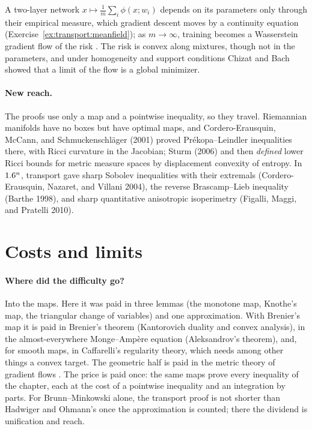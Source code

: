 \begin{refsection}
A two-layer network $x\mapsto\frac1m\sum_i\phi(x;w_i)$ depends on its parameters only through their empirical measure, which gradient descent moves by a continuity equation (Exercise~\ref{ex:transport:meanfield}); as $m\to\infty$, training becomes a Wasserstein gradient flow of the risk \parencite{ChizatBach2018,MeiMontanariNguyen2018}. The risk is convex along mixtures, though not in the parameters, and under homogeneity and support conditions Chizat and Bach showed that a limit of the flow is a global minimizer.

\paragraph{New reach.}\label{sec:transport:reach} The proofs use only a map and a pointwise inequality, so they travel. Riemannian manifolds have no boxes but have optimal maps, and Cordero-Erausquin, McCann, and Schmuckenschl\"ager (2001) proved Pr\'ekopa--Leindler inequalities there, with Ricci curvature in the Jacobian; Sturm (2006) and \textcite{LottVillani2009} then \emph{defined} lower Ricci bounds for metric measure spaces by displacement convexity of entropy. In $1.6^n$, transport gave sharp Sobolev inequalities with their extremals (Cordero-Erausquin, Nazaret, and Villani 2004), the reverse Brascamp--Lieb inequality (Barthe 1998), and sharp quantitative anisotropic isoperimetry (Figalli, Maggi, and Pratelli 2010).

\section{Costs and limits}\label{sec:transport:costs}

\paragraph{Where did the difficulty go?}
Into the maps. Here it was paid in three lemmas (the monotone map, Knothe's map, the triangular change of variables) and one approximation. With Brenier's map it is paid in Brenier's theorem (Kantorovich duality and convex analysis), in the almost-everywhere Monge--Amp\`ere equation (Aleksandrov's theorem), and, for smooth maps, in Caffarelli's regularity theory, which needs among other things a convex target. The geometric half is paid in the metric theory of gradient flows \parencite{AmbrosioGigliSavare2008}. The price is paid once: the same maps prove every inequality of the chapter, each at the cost of a pointwise inequality and an integration by parts. For Brunn--Minkowski alone, the transport proof is not shorter than Hadwiger and Ohmann's once the approximation is counted; there the dividend is unification and reach.


\end{refsection}
